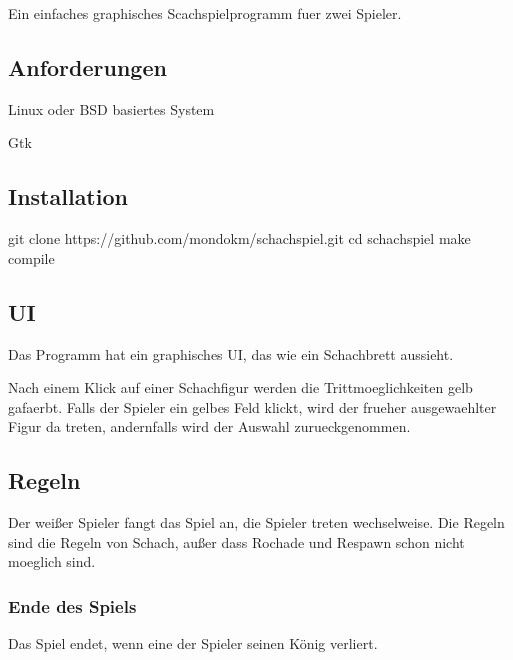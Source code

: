 Ein einfaches graphisches Scachspielprogramm fuer zwei Spieler.

\subsection*{Anforderungen}


\begin{DoxyItemize}
\item Linux oder B\+SD basiertes System
\item Gtk
\end{DoxyItemize}

\subsection*{Installation}


\begin{DoxyCode}
git clone https://github.com/mondokm/schachspiel.git
cd schachspiel
make compile
\end{DoxyCode}


\subsection*{UI}

Das Programm hat ein graphisches UI, das wie ein Schachbrett aussieht.



Nach einem Klick auf einer Schachfigur werden die Trittmoeglichkeiten gelb gafaerbt. Falls der Spieler ein gelbes Feld klickt, wird der frueher ausgewaehlter Figur da treten, andernfalls wird der Auswahl zurueckgenommen.

\subsection*{Regeln}

Der weißer Spieler fangt das Spiel an, die Spieler treten wechselweise. Die Regeln sind die Regeln von Schach, außer dass Rochade und Respawn schon nicht moeglich sind.

\subsubsection*{Ende des Spiels}

Das Spiel endet, wenn eine der Spieler seinen König verliert. 